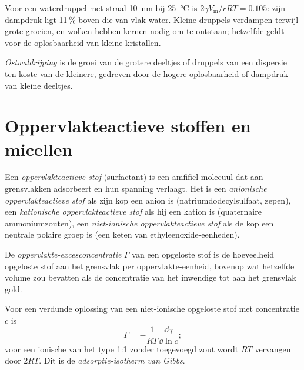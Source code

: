 Voor een waterdruppel met straal \qty{10}{nm} bij \qty{25}{\celsius} is $2\gamma V_{\mathrm m}/rRT = 0.105$: zijn
dampdruk ligt 11\,\% boven die van vlak water. Kleine druppels verdampen
terwijl grote groeien, en wolken hebben kernen nodig om te ontstaan;
hetzelfde geldt voor de oplosbaarheid van kleine kristallen.

\begin{definition}[Ostwaldrijping]\label{def:b3:colloids:ripening}
\emph{Ostwaldrijping} is de groei van de grotere
deeltjes of druppels van een dispersie ten koste van de kleinere,
gedreven door de hogere oplosbaarheid of dampdruk van kleine deeltjes.
\end{definition}

\section{Oppervlakteactieve stoffen en micellen}

\begin{definition}\label{def:b3:colloids:surfactant}
Een \emph{oppervlakteactieve stof}
(surfactant) is een amfifiel molecuul dat aan grensvlakken adsorbeert en
hun spanning verlaagt. Het is een
\emph{anionische oppervlakteactieve stof}
als zijn kop een anion is (natriumdodecylsulfaat, zepen), een
\emph{kationische oppervlakteactieve stof}
als hij een kation is (quaternaire ammoniumzouten), een
\emph{niet-ionische oppervlakteactieve
stof} als de kop een neutrale
polaire groep is (een keten van ethyleenoxide-eenheden).
\end{definition}

\begin{definition}\label{def:b3:colloids:surface-excess}
De \emph{oppervlakte-excesconcentratie} $\Gamma$ van een
opgeloste stof is de hoeveelheid opgeloste stof aan het grensvlak per
oppervlakte-eenheid, bovenop wat hetzelfde volume zou bevatten als de
concentratie van het inwendige tot aan het grensvlak gold.
\end{definition}

\begin{theorem}\label{thm:b3:colloids:gibbs-adsorption}
Voor een verdunde oplossing van een niet-ionische opgeloste stof met
concentratie $c$ is
\[
  \Gamma = -\frac{1}{RT}\frac{\dd\gamma}{\dd\ln c};
\]
voor een ionische  van het type 1:1 zonder
toegevoegd zout wordt $RT$ vervangen door $2RT$. Dit is
de \emph{adsorptie-isotherm van Gibbs}.
\end{theorem}

